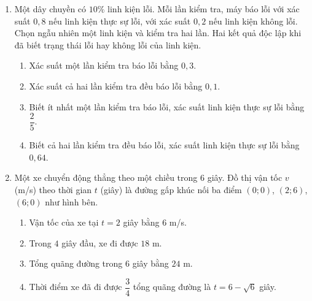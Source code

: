 \documentclass[12pt,a4paper]{article}
\begin{document}
\begin{enumerate}
\begin{minipage}[t]{0.42\linewidth}
{}
\end{minipage}
\item Một dây chuyền có $10\%$ linh kiện lỗi. Mỗi lần kiểm tra, máy báo lỗi với xác suất $0{,}8$ nếu linh kiện thực sự lỗi, với xác suất $0{,}2$ nếu linh kiện không lỗi. Chọn ngẫu nhiên một linh kiện và kiểm tra hai lần. Hai kết quả độc lập khi đã biết trạng thái lỗi hay không lỗi của linh kiện.
\begin{enumerate}[label=\alph*)]
\item Xác suất một lần kiểm tra báo lỗi bằng $0{,}3$.
\item Xác suất cả hai lần kiểm tra đều báo lỗi bằng $0{,}1$.
\item Biết ít nhất một lần kiểm tra báo lỗi, xác suất linh kiện thực sự lỗi bằng $\dfrac25$.
\item Biết cả hai lần kiểm tra đều báo lỗi, xác suất linh kiện thực sự lỗi bằng $0{,}64$.
\end{enumerate}
\item \begin{minipage}[t]{0.55\linewidth}
Một xe chuyển động thẳng theo một chiều trong $6$ giây. Đồ thị vận tốc $v$ (m/s) theo thời gian $t$ (giây) là đường gấp khúc nối ba điểm $(0;0)$, $(2;6)$, $(6;0)$ như hình bên.
\begin{enumerate}[label=\alph*)]
\item Vận tốc của xe tại $t=2$ giây bằng $6$ m/s.
\item Trong $4$ giây đầu, xe đi được $18$ m.
\item Tổng quãng đường trong $6$ giây bằng $24$ m.
\item Thời điểm xe đã đi được $\dfrac34$ tổng quãng đường là $t=6-\sqrt6$ giây.
\end{enumerate}
\end{minipage}\hfill
\begin{minipage}[t]{0.42\linewidth}\vspace{-0.4\baselineskip}\centering
{}
\end{minipage}
\end{enumerate}
\end{document}
